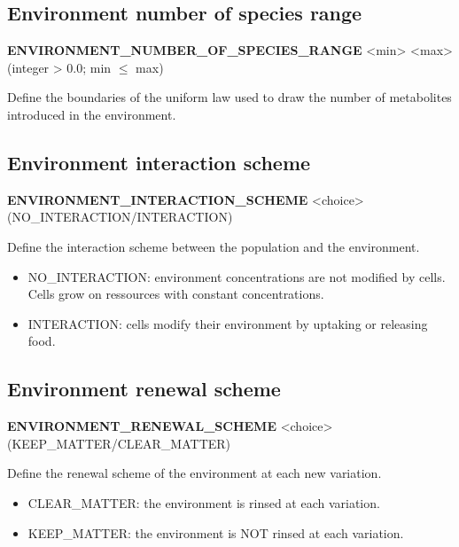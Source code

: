 
\subsection{Environment number of species range}
\begin{center}
{\bf ENVIRONMENT\_NUMBER\_OF\_SPECIES\_RANGE} <min> <max> (integer > 0.0; min $\le$ max)
\end{center}
Define the boundaries of the uniform law used to draw the number of metabolites introduced in the environment.


\subsection{Environment interaction scheme}
\begin{center}
{\bf ENVIRONMENT\_INTERACTION\_SCHEME} <choice> (NO\_INTERACTION/INTERACTION)
\end{center}
Define the interaction scheme between the population and the environment.
\begin{itemize}
\item NO\_INTERACTION: environment concentrations are not modified by cells. Cells grow on ressources with constant concentrations.
\item INTERACTION: cells modify their environment by uptaking or releasing food.
\end{itemize}


\subsection{Environment renewal scheme}
\begin{center}
{\bf ENVIRONMENT\_RENEWAL\_SCHEME} <choice> (KEEP\_MATTER/CLEAR\_MATTER)
\end{center}
Define the renewal scheme of the environment at each new variation.
\begin{itemize}
\item CLEAR\_MATTER: the environment is rinsed at each variation.
\item KEEP\_MATTER: the environment is NOT rinsed at each variation.
\end{itemize}



